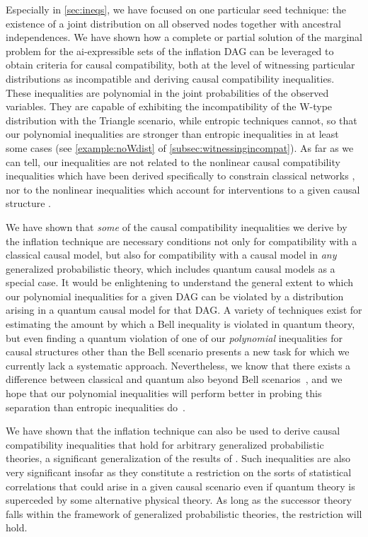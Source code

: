 \documentclass[aps,english,10pt,superscriptaddress,onecolumn,twoside,longbibliography,pra,floatfix,fleqn,nofootinbib]{revtex4-1}%
\theoremstyle{definition}
\newcounter{example}[section]
\begin{document}
Especially in \cref{sec:ineqs}, we have focused on one particular seed technique: the existence of a joint distribution on all observed nodes together with ancestral independences. We have shown how a complete or partial solution of the marginal problem for the ai-expressible sets of the inflation DAG can be leveraged to obtain criteria for causal compatibility, both at the level of witnessing particular distributions as incompatible and deriving causal compatibility inequalities. These inequalities are polynomial in the joint probabilities of the observed variables. They are capable of exhibiting the incompatibility of the W-type distribution with the Triangle scenario, while entropic techniques cannot, so that our polynomial inequalities are stronger than entropic inequalities in at least some cases (see \cref{example:noWdist} of \cref{subsec:witnessingincompat}). As far as we can tell, our inequalities are not related to the nonlinear causal compatibility inequalities which have been derived specifically to constrain classical networks \cite{TavakoliStarNetworks,RossetNetworks,TavakoliNoncyclicNetworks}, nor to the nonlinear inequalities which account for interventions to a given causal structure \cite{kang2007polynomialconstraints,steeg2011relaxation}.

We have shown that \emph{some} of the causal compatibility inequalities we derive by the inflation technique are necessary conditions not only for compatibility with a classical causal model, but also for compatibility with a causal model in {\em any} generalized probabilistic theory, which includes quantum causal models as a special case. It would be enlightening to understand the general extent to which our polynomial inequalities for a given DAG can be violated by a distribution arising in a quantum causal model for that DAG. A variety of techniques exist for estimating the amount by which a Bell inequality \cite{NPA2008Long,I3322NPA1} is violated in quantum theory, but even finding a quantum violation of one of our \emph{polynomial} inequalities for causal structures other than the Bell scenario presents a new task for which we currently lack a systematic approach. Nevertheless, we know that there exists a difference between classical and quantum also beyond Bell scenarios~\cite[Theorem~2.16]{fritz2012bell}, and we hope that our polynomial inequalities will perform better in probing this separation than entropic inequalities do~\cite{pusey2014gdag,Chaves2015infoquantum}. 

We have shown that the inflation technique can also be used to derive causal compatibility inequalities that hold for arbitrary generalized probabilistic theories, a significant generalization of the results of \cite{pusey2014gdag}.  Such inequalities are also very significant insofar as they constitute a restriction on the sorts of statistical correlations that could arise in a given causal scenario even if quantum theory is superceded by some alternative physical theory.  As long as the successor theory falls within the framework of generalized probabilistic theories, the restriction will hold. 
\end{document}
